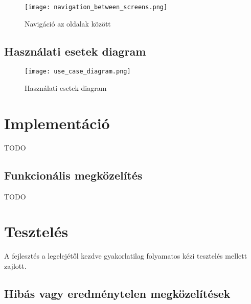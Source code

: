 \begin{figure}[H]
	\centering
	\texttt{[image: navigation\_between\_screens.png]}
	\caption{Navigáció az oldalak között}
	\label{fig:navigation_between_screens}
\end{figure}

\cleardoublepage
\subsection{Használati esetek diagram}
\begin{figure}[H]
	\centering
	\texttt{[image: use\_case\_diagram.png]}
	\caption{Használati esetek diagram}
	\label{fig:use_case_diagram}
\end{figure}
\cleardoublepage

\section{Implementáció}
TODO

\subsection{Funkcionális megközelítés}
TODO

\section{Tesztelés}
A fejlesztés a legelejétől kezdve gyakorlatilag folyamatos kézi tesztelés mellett zajlott.

\subsection{Hibás vagy eredménytelen megközelítések}
